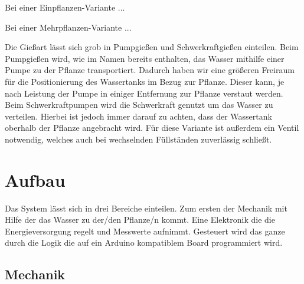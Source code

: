 \documentclass[]{IEEEtran}
\begin{document}
Bei einer Einpflanzen-Variante ...

Bei einer Mehrpflanzen-Variante ...

Die Gießart lässt sich grob in Pumpgießen und Schwerkraftgießen einteilen. Beim Pumpgießen wird, wie im Namen bereits enthalten, das Wasser mithilfe einer Pumpe zu der Pflanze transportiert. Dadurch haben wir eine größeren Freiraum für die Positionierung des Wassertanks im Bezug zur Pflanze. Dieser kann, je nach Leistung der Pumpe in einiger Entfernung zur Pflanze verstaut werden. 
Beim Schwerkraftpumpen wird die Schwerkraft genutzt um das Wasser zu verteilen. Hierbei ist jedoch immer darauf zu achten, dass der Wassertank oberhalb der Pflanze angebracht wird. Für diese Variante ist außerdem ein Ventil notwendig, welches auch bei wechselnden Füllständen zuverlässig schließt.


\section{Aufbau}
Das System lässt sich in drei Bereiche einteilen. Zum ersten der Mechanik mit Hilfe der das Wasser zu der/den Pflanze/n kommt. Eine Elektronik die die Energieversorgung regelt und Messwerte aufnimmt. Gesteuert wird das ganze durch die Logik die auf ein Arduino kompatiblem Board programmiert wird.
\subsection{Mechanik}
\end{document}
